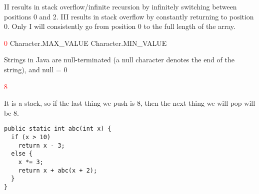 \documentclass[11pt,addpoints]{exam}
\begin{document}
\begin{questions}
\begin{minipage}{\textwidth}
II results in stack overflow/infinite recursion by infinitely switching between positions 0 and 2. III results in stack overflow by constantly returning to position 0. Only I will consistently go from position 0 to the full length of the array.

\end{minipage}


\begin{minipage}{\textwidth}

\begin{choices}
  \choice \textcolor{red}{0}
  \choice Character.MAX\_VALUE
  \choice Character.MIN\_VALUE
   \\ 
\end{choices}
\end{minipage}

Strings in Java are null-terminated (a null character denotes the end of the string), and null = 0 \\

\begin{minipage}{\textwidth}

\begin{choices}
  \choice \textcolor{red}{8}
   \\
\end{choices}
\end{minipage}

It is a stack, so if the last thing we push is 8, then the next thing we will pop will be 8. \\

\begin{minipage}{\textwidth}



\begin{verbatim}
public static int abc(int x) {
  if (x > 10)
    return x - 3;
  else {
    x *= 3;
    return x + abc(x + 2);
  }
}
\end{verbatim}


\end{minipage}
\end{questions}
\end{document}
